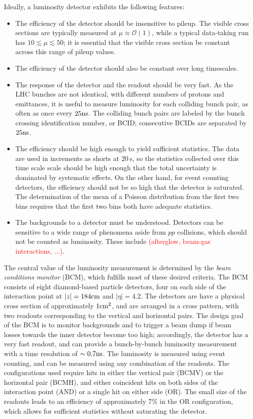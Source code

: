 Ideally, a luminosity detector exhibits the following features: 

\begin{itemize}
	\item The efficiency of the detector should be insensitive to pileup. The visible cross sections are typically measured at $\mu\approx \mathcal{O}(1)$, while a typical data-taking run has $10\lesssim\mu\lesssim50$; it is essential that the visible cross section be constant across this range of pileup values.
	\item The efficiency of the detector should also be constant over long timescales.
	\item The response of the detector and the readout should be very fast. As the LHC bunches are not identical, with different numbers of protons and emittances, it is useful to measure luminosity for each colliding bunch pair, as often as once every $25 \mathrm{ns}$. The colliding bunch pairs are labeled by the bunch crossing identification number, or BCID; consecutive BCIDs are separated by $25 \mathrm{ns}$. 
	\item The efficiency should be high enough to yield sufficient statistics. The data are used in increments as shorts at $20~$s, so the statistics collected over this time scale scale should be high enough that the total uncertainty is dominated by systematic effects. On the other hand, for event counting detectors, the efficiency should not be so high that the detector is saturated. The determination of the mean of a Poisson distribution from the first two bins requires that the first two bins both have adequate statistics. 
	\item The backgrounds to a detector must be understood. Detectors can be sensitive to a wide range of phenomena aside from $pp$ collisions, which should not be counted as luminosity. These include \textcolor{red}{(afterglow, beam-gas interactions, ...)}. 
\end{itemize}

The central value of the luminosity measurement is determined by the \emph{beam conditions monitor} (BCM), which fulfills most of these desired criteria. The BCM consists of eight diamond-based particle detectors, four on each side of the interaction point at $|z|=184 \mathrm{cm}$ and $|\eta|=4.2$. The detectors are have a physical cross section of approximately $1 \mathrm{cm}^2$, and are arranged in a cross pattern, with two readouts corresponding to the vertical and horizontal pairs. The design goal of the BCM is to monitor backgrounds and to trigger a beam dump if beam losses towards the inner detector become too high; accordingly, the detector has a very fast readout, and can provide a bunch-by-bunch luminosity measurement with a time resolution of $\sim 0.7 \mathrm{ns}$. The luminosity is measured using event counting, and can be measured using any combination of the readouts. The configurations used require hits in either the vertical pair (BCMV) or the horizontal pair (BCMH), and either coincident hits on both sides of the interaction point (AND) or a single hit on either side (OR). The small size of the readouts leads to an efficiency of approximately 7\% in the OR configuration, which allows for sufficient statistics without saturating the detector. 

